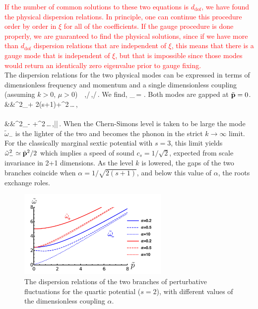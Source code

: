 \textcolor{red}{If the number of common solutions to these two equations is $d_{\text{dof}}$, we have found the physical dispersion relations. In principle, one can continue this procedure order by order in $\xi$ for all of the coefficients. If the gauge procedure is done properly, we are guaranteed to find the physical solutions, since if we have more than $d_{\text{dof}}$ dispersion relations that are independent of $\xi$, this means that there is a gauge mode that is independent of $\xi$, but that is impossible since those modes would return an identically zero eigenvalue prior to gauge fixing.}\\
\indent The dispersion relations for the two physical modes can be expressed in terms of dimensionless frequency and  momentum  and a single dimensionless coupling (assuming $k>0$, $\mu>0$)
\be
\alpha\equiv\, \,,\qquad \tilde \omega\equiv\omega/\mu\,,\qquad {}/\mu\,.\label{alpha}
\ee
We find,
\be
\tilde\omega_{\pm}\,=\,\,.
\ee
Both modes are gapped at $\tilde{\bf p}=0$. 
\bea
&&\tilde\omega^2_+\,\simeq\,2(s+1)+^2\,\ldots\,, \\\nonumber \\\nonumber
&&\tilde\omega^2_-\,\simeq\,+^2\,\ldots\,,\qquad\qquad ||\,.
\eea
When the Chern-Simons level is taken to be large the mode $\tilde\omega_{-}$ is the lighter of the two and becomes the phonon in the strict $k\to\infty$ limit.
For the classically marginal sextic potential with $s=3$, this limit yields $\tilde\omega_-^2\simeq \tilde {\bf p}^2/2$ which implies a speed of sound $c_s=1/\sqrt 2$, expected from scale invariance in 2+1 dimensions. As the level $k$ is lowered, the gaps of the two branches coincide when $\alpha=1/\sqrt{2(s+1)}$, and below this value of $\alpha$, the roots exchange roles.
\begin{figure}[H]
\begin{center}
    \includegraphics[width=0.65\textwidth]{Chapter_2_Folder_1912.11321/figures/Dispersion_relations.pdf}    
    \caption[Dispersion relations for the \textcolor{red}{a}belian Chern-Simons theory in the symmetry broken phase.]{{\small The dispersion relations of the two branches of perturbative fluctuations for the quartic potential ($s=2$), with different values of the dimensionless coupling $\alpha$.}} \label{fig:dispersion}
    \end{center}
\end{figure}
